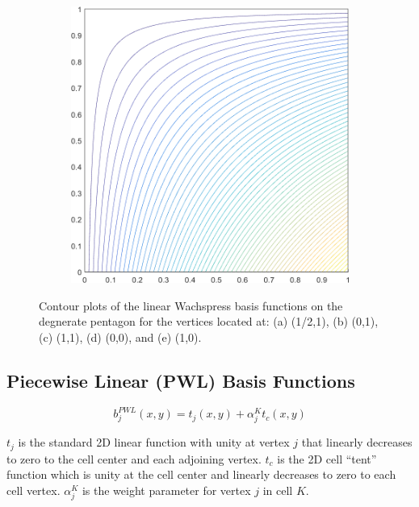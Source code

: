 \begin{figure}
\begin{subfigure}[b]{0.39\textwidth}
		\caption{}
	\end{subfigure}
	\hspace{1.5cm}
	\begin{subfigure}[b]{0.39\textwidth}
		\centering
		\includegraphics[width=\textwidth]{figures/sec_BF/deg_square_WACHSPRESS1_contour_b2.png}
		\caption{}
	\end{subfigure}
\caption{Contour plots of the linear Wachspress basis functions on the degnerate pentagon for the vertices located at: (a) (1/2,1), (b) (0,1), (c) (1,1), (d) (0,0), and (e) (1,0).}
\end{figure}

\subsection{Piecewise Linear (PWL) Basis Functions}
\label{sec::BF_2DLinear_PWL}

\begin{equation}
\label{eq::PWL_2D}
	b_j^{PWL} (x,y) = t_j (x,y) + \alpha_j^K t_c (x,y)
\end{equation}

\noindent $t_j$ is the standard 2D linear function with unity at vertex $j$ that linearly decreases to zero to the cell center and each adjoining vertex. $t_c$ is the 2D cell ``tent'' function which is unity at the cell center and linearly decreases to zero to each cell vertex. $\alpha_{j}^{K}$ is the weight parameter for vertex $j$ in cell $K$. 

